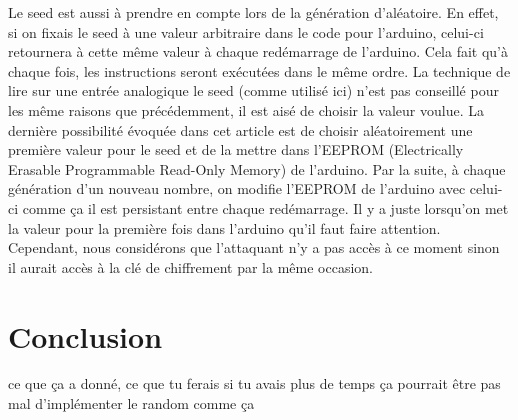 \documentclass[letterpaper]{article}
\begin{document}
Le seed est aussi à prendre en compte lors de la génération d'aléatoire.
En effet, si on fixais le seed à une valeur arbitraire dans le code pour l'arduino, celui-ci retournera à cette même valeur à chaque redémarrage de l'arduino.
Cela fait qu'à chaque fois, les instructions seront exécutées dans le même ordre.
La technique de lire sur une entrée analogique le seed (comme utilisé ici) n'est pas conseillé pour les même raisons que précédemment, il est aisé de choisir la valeur voulue.
La dernière possibilité évoquée dans cet article est de choisir aléatoirement une première valeur pour le seed et de la mettre dans l'EEPROM (Electrically Erasable Programmable Read-Only Memory) de l'arduino. Par la suite, à chaque génération d'un nouveau nombre, on modifie l'EEPROM de l'arduino avec celui-ci comme ça il est persistant entre chaque redémarrage.
Il y a juste lorsqu'on met la valeur pour la première fois dans l'arduino qu'il faut faire attention.
Cependant, nous considérons que l'attaquant n'y a pas accès à ce moment sinon il aurait accès à la clé de chiffrement par la même occasion.

\section{Conclusion}
ce que ça a donné, ce que tu ferais si tu avais plus de temps
ça pourrait être pas mal d'implémenter le random comme ça


\footnotesize


\end{document}
